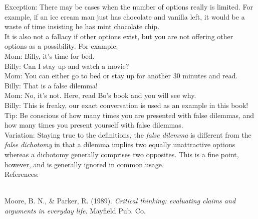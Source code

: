 \documentclass[a4paper,12pt,single,pdftex]{scrbook}
\begin{document}
{    
      Exception: There may be cases when the number of options really is limited.  For example, if an ice cream man just has chocolate and vanilla left, it would be a waste of time insisting he has mint chocolate chip. 
    \\

    
      It is also not a fallacy if other options exist, but you are not offering other options as a possibility.  For example:
    \\

    
      Mom: Billy, it’s time for bed.
    \\

    
      Billy: Can I stay up and watch a movie?
    \\

    
      Mom: You can either go to bed or stay up for another 30 minutes and read.
    \\

    
      Billy: That is a false dilemma!
    \\

    
      Mom: No, it’s not.  Here, read Bo’s book and you will see why.
    \\

    
      Billy: This is freaky, our exact conversation is used as an example in this book!
    \\

    
      Tip: Be conscious of how many times you are presented with false dilemmas, and how many times you present yourself with false dilemmas.
    \\

    
      Variation: Staying true to the definitions, the {\it false dilemma}  is different from the {\it false dichotomy} in that a dilemma implies two equally unattractive options whereas a dichotomy generally comprises two opposites. This is a fine point, however, and is generally ignored in common usage.
    \\

    References:

    
      
        
      \\

      
        
          Moore, B. N., \& Parker, R. (1989). {\it Critical thinking: evaluating claims and arguments in everyday life}. Mayfield Pub. Co.
        
      
    
  }
\end{document}
